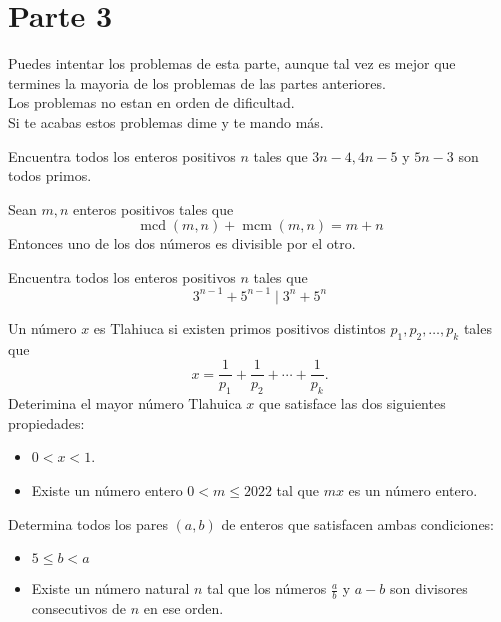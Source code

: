 \documentclass[11pt]{scrartcl}
\newcommand{\mcd}{\operatorname{mcd}}
\newcommand{\mcm}{\operatorname{mcm}}
\begin{document}
\newpage
\section{Parte 3}
Puedes intentar los problemas de esta parte, aunque tal vez es mejor que termines la mayoria de los problemas de las partes anteriores. \\
Los problemas no estan en orden de dificultad. \\
Si te acabas estos problemas dime y te mando m\'as.

\begin{problem}
Encuentra todos los enteros positivos $n$ tales que $3n-4, 4n-5$ y $5n-3$ son todos primos.
\end{problem}




\begin{problem} %
Sean $m,n$ enteros positivos tales que 
\[\mcd(m,n)+ \mcm(m,n) = m+n\]
Entonces uno de los dos n\'umeros es divisible por el otro.
\end{problem}



\begin{problem} %
Encuentra todos los enteros positivos $n$ tales que 
\[3^{n-1}+5^{n-1} \mid 3^n+5^n\]
\end{problem}


\begin{problem} %

    Un número $x$ es Tlahiuca si existen primos positivos distintos $p_1,p_2,\dots,p_k$ tales que 
\[x=\frac{1}{p_1}+\frac{1}{p_2}+\cdots+\frac{1}{p_k}.\]
Deterimina el mayor número Tlahuica $x$ que satisface las dos siguientes propiedades:
 \begin{itemize} 
 \item  $0< x < 1$. 
 \item  Existe un número entero $0< m\leq 2022$ tal que $mx$ es un número entero. 
 \end{itemize} 
    
\end{problem}

\begin{problem} %
Determina todos los pares $(a,b)$ de enteros que satisfacen ambas condiciones: 
\begin{itemize}
\item $5 \leq b <a$
\item Existe un n\'umero natural $n$ tal que los n\'umeros $\frac ab$ y $a-b$ son divisores consecutivos de $n$ en ese orden.
\end{itemize}
\end{problem}
\end{document}
